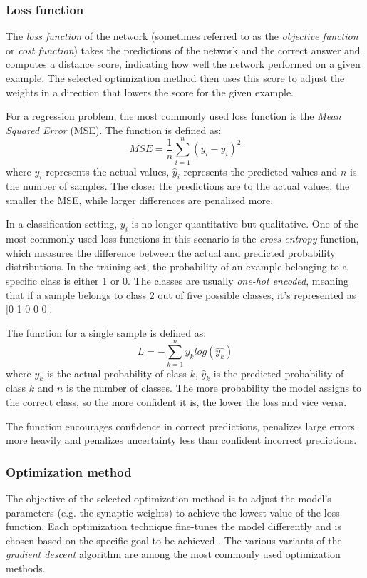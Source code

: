 \documentclass[a4paper,oneside,onecolumn,12pt]{book}
\begin{document}
		\subsubsection{Loss function}
		The \textit{loss function} of the network (sometimes referred to as the \textit{objective function} or \textit{cost function}) takes the predictions of the network and the correct answer and computes a distance score, indicating how well the network performed on a given example. The selected optimization method then uses this score to adjust the weights in a direction that lowers the score for the given example. \cite{DLP}

		For a regression problem, the most commonly used loss function is the \textit{Mean Squared Error} (MSE). The function is defined as:
		\[ MSE = \frac{1}{n} \sum_{i=1}^{n} (y_i - \hat{y}_i)^2 \]
		where $y_i$ represents the actual values, $\hat{y}_i$ represents the predicted values and $n$ is the number of samples. The closer the predictions are to the actual values, the smaller the MSE, while larger differences are penalized more. \cite{AISL}

		In a classification setting, $y_i$ is no longer quantitative but qualitative. One of the most commonly used loss functions in this scenario is the \textit{cross-entropy} function, which measures the difference between the actual and predicted probability distributions. In the training set, the probability of an example belonging to a specific class is either 1 or 0. The classes are usually \textit{one-hot encoded}, meaning that if a sample belongs to class 2 out of five possible classes, it's represented as [0 1 0 0 0].

		The function for a single sample is defined as:
		\[ L = -\sum_{k=1}^{n} y_k log(\hat{y_k}) \]
		where $y_k$ is the actual probability of class $k$, $\hat{y}_k$ is the predicted probability of class $k$ and $n$ is the number of classes. The more probability the model assigns to the correct class, so the more confident it is, the lower the loss and vice versa. \cite{AISL}

		The function encourages confidence in correct predictions, penalizes large errors more heavily and penalizes uncertainty less than confident incorrect predictions.\cite{BOCEL}

		\subsubsection{Optimization method}
		The objective of the selected optimization method is to adjust the model's parameters (e.g. the synaptic weights) to achieve the lowest value of the loss function. Each optimization technique fine-tunes the model differently and is chosen based on the specific goal to be achieved \cite{COOTMLT}. The various variants of the \textit{gradient descent} algorithm are among the most commonly used optimization methods.
\end{document}
